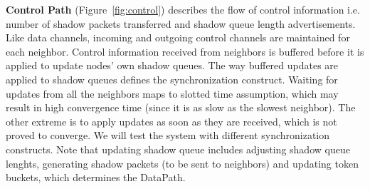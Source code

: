 \textbf{Control Path} (Figure~\ref{fig:control}) describes the flow of control information i.e. number of shadow packets transferred and shadow queue length advertisements. Like data channels, incoming and outgoing control channels are maintained for each neighbor. Control information received from neighbors is buffered before it is applied to update nodes' own shadow queues. The way buffered updates are applied to shadow queues defines the synchronization construct. Waiting for updates from all the neighbors maps to slotted time assumption, which may result in high convergence time (since it is as slow as the slowest neighbor). The other extreme is to apply updates as soon as they are received, which is not proved to converge. We will test the system with different synchronization constructs. Note that updating shadow queue includes adjusting shadow queue lenghts, generating shadow packets (to be sent to neighbors) and updating token buckets, which determines the DataPath.
